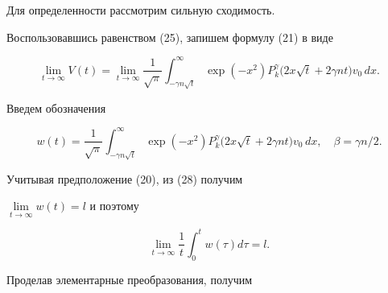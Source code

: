 Для определенности рассмотрим сильную сходимость.


Воспользовавшись равенством (25), запишем формулу (21) в виде


\begin{equation}


\lim_{t\to\infty}V(t)= \lim_{t\to\infty}\frac{1}{\sqrt{\pi}}


\int_{-\gamma n\sqrt{t}}^\infty


\exp(-x^2)P_k^\gamma\big (2x\sqrt{t}+2\gamma nt\big )v_0\, dx.


\end{equation}


Введем обозначения


$$


w(t)=\frac{1}{\sqrt{\pi}}


\int_{-\gamma n\sqrt{t}}^\infty


\exp(-x^2)P_k^\gamma\big (2x\sqrt{t}+2\gamma nt\big )


v_0\, dx,\quad \beta=\gamma n/2.


$$


Учитывая предположение (20), из (28) получим


$\lim\limits_{t\to\infty}w(t)=l$ и поэтому


\begin{equation}


\lim_{t\to\infty}\frac{1}{t}\int_0^t w(\tau) d\tau = l.


\end{equation}


Проделав элементарные преобразования, получим


